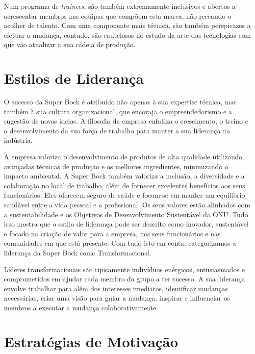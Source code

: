 Num programa de \textit{trainees}, são também extremamente inclusivos e abertos a acrescentar membros nas equipas que compõem esta marca, não receando o acolher de talento. Com uma componente mais técnica, são também perspicazes a efetuar a mudança, contudo, são cautelosos no estudo da arte das tecnologias com que vão atualizar a sua cadeia de produção. 

\section{Estilos de Liderança}

O sucesso da Super Bock é atribuído não apenas à sua expertise técnica, mas também à sua cultura organizacional, que encoraja o empreendedorismo e a sugestão de novas ideias. A filosofia da empresa enfatiza o crescimento, o treino e o desenvolvimento da sua força de trabalho para manter a sua liderança na indústria.

A empresa valoriza o desenvolvimento de produtos de alta qualidade utilizando avançadas técnicas de produção e os melhores ingredientes, minimizando o impacto ambiental. A Super Bock também valoriza a inclusão, a diversidade e a colaboração no local de trabalho, além de fornecer excelentes benefícios aos seus funcionários. Eles oferecem seguro de saúde e focam-se em manter um equilíbrio saudável entre a vida pessoal e a profissional. Os seus valores estão alinhados com a sustentabilidade e os Objetivos de Desenvolvimento Sustentável da ONU. Tudo isso mostra que o estilo de liderança pode ser descrito como inovador, sustentável e focado na criação de valor para a empresa, nos seus funcionários e nas comunidades em que está presente. Com tudo isto em conta, categorizamos a liderança da Super Bock como Transformacional.

Líderes transformacionais são tipicamente indivíduos enérgicos, entusiasmados e comprometidos em ajudar cada membro do grupo a ter sucesso. A sua liderança envolve trabalhar para além dos interesses imediatos, identificar mudanças necessárias, criar uma visão para guiar a mudança, inspirar e influenciar os membros a executar a mudança colaborativamente.


\section{Estratégias de Motivação}
